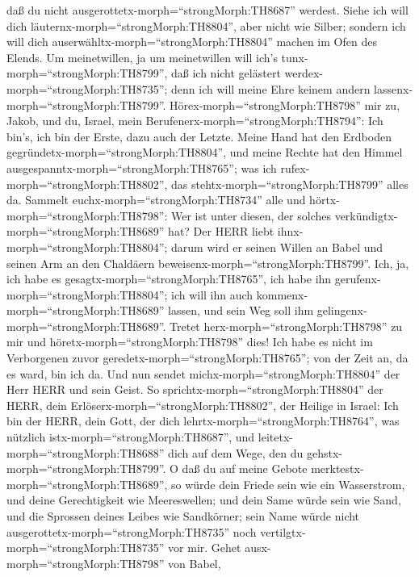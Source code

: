 daß du nicht ausgerottetx-morph=``strongMorph:TH8687'' werdest.
 Siehe ich will dich läuternx-morph=``strongMorph:TH8804'',
aber nicht wie Silber; sondern ich will dich
auserwähltx-morph=``strongMorph:TH8804'' machen im Ofen des Elends.
 Um meinetwillen, ja um meinetwillen will ich's
tunx-morph=``strongMorph:TH8799'', daß ich nicht gelästert
werdex-morph=``strongMorph:TH8735''; denn ich will meine Ehre keinem
andern lassenx-morph=``strongMorph:TH8799''. 
Hörex-morph=``strongMorph:TH8798'' mir zu, Jakob, und du, Israel, mein
Berufenerx-morph=``strongMorph:TH8794'': Ich bin's, ich bin der Erste,
dazu auch der Letzte.  Meine Hand hat den Erdboden
gegründetx-morph=``strongMorph:TH8804'', und meine Rechte hat den Himmel
ausgespanntx-morph=``strongMorph:TH8765''; was ich
rufex-morph=``strongMorph:TH8802'', das
stehtx-morph=``strongMorph:TH8799'' alles da.  Sammelt
euchx-morph=``strongMorph:TH8734'' alle und
hörtx-morph=``strongMorph:TH8798'': Wer ist unter diesen, der solches
verkündigtx-morph=``strongMorph:TH8689'' hat? Der HERR liebt
ihnx-morph=``strongMorph:TH8804''; darum wird er seinen Willen an Babel
und seinen Arm an den Chaldäern beweisenx-morph=``strongMorph:TH8799''.
 Ich, ja, ich habe es gesagtx-morph=``strongMorph:TH8765'',
ich habe ihn gerufenx-morph=``strongMorph:TH8804''; ich will ihn auch
kommenx-morph=``strongMorph:TH8689'' lassen, und sein Weg soll ihm
gelingenx-morph=``strongMorph:TH8689''.  Tretet
herx-morph=``strongMorph:TH8798'' zu mir und
höretx-morph=``strongMorph:TH8798'' dies! Ich habe es nicht im
Verborgenen zuvor geredetx-morph=``strongMorph:TH8765''; von der Zeit
an, da es ward, bin ich da. Und nun sendet
michx-morph=``strongMorph:TH8804'' der Herr HERR und sein Geist.
 So sprichtx-morph=``strongMorph:TH8804'' der HERR, dein
Erlöserx-morph=``strongMorph:TH8802'', der Heilige in Israel: Ich bin
der HERR, dein Gott, der dich lehrtx-morph=``strongMorph:TH8764'', was
nützlich istx-morph=``strongMorph:TH8687'', und
leitetx-morph=``strongMorph:TH8688'' dich auf dem Wege, den du
gehstx-morph=``strongMorph:TH8799''.  O daß du auf meine
Gebote merktestx-morph=``strongMorph:TH8689'', so würde dein Friede sein
wie ein Wasserstrom, und deine Gerechtigkeit wie Meereswellen;
 und dein Same würde sein wie Sand, und die Sprossen deines
Leibes wie Sandkörner; sein Name würde nicht
ausgerottetx-morph=``strongMorph:TH8735'' noch
vertilgtx-morph=``strongMorph:TH8735'' vor mir.  Gehet
ausx-morph=``strongMorph:TH8798'' von Babel,
